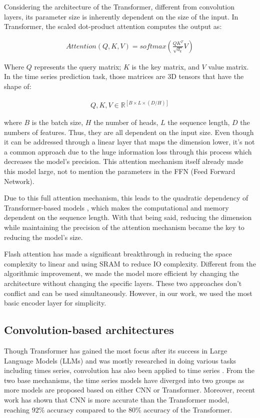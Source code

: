 \documentclass[stu,12pt,floatsintext]{apa7}
\begin{document}
Considering the architecture of the Transformer, different from convolution layers, its parameter size is inherently dependent on the size of the input. In Transformer, the scaled dot-product attention \cite{attention-is-all-you-need} computes the output as:

\begin{gather}
    Attention(Q,K,V)=softmax(\frac{QK^T}{\sqrt{d_k}}V)
\end{gather}

Where $Q$ represents the query matrix; $K$ is the key matrix, and $V$ value matrix. In the time series prediction task, those matrices are 3D tensors that have the shape of:

\begin{gather}
        Q,K,V\in \mathbb{R}^{[B\times L\times (D/H)]}
\end{gather}

where $B$ is the batch size, $H$ the number of heads, $L$ the sequence length, $D$ the numbers of features. Thus, they are all dependent on the input size. Even though it can be addressed through a linear layer that maps the dimension lower, it's not a common approach due to the huge information loss through this process which decreases the model's precision. This attention mechanism itself already made this model large, not to mention the parameters in the FFN (Feed Forward Network). 

Due to this full attention mechanism, this leads to the quadratic dependency of Transformer-based models \cite{bigbird}, which makes the computational and memory dependent on the sequence length. With that being said, reducing the dimension while maintaining the precision of the attention mechanism became the key to reducing the model's size. 

Flash attention has made a significant breakthrough in reducing the space complexity to linear and using SRAM to reduce IO complexity. Different from the algorithmic improvement, we made the model more efficient by changing the architecture without changing the specific layers. These two approaches don't conflict and can be used simultaneously. However, in our work, we used the most basic encoder layer for simplicity. 

\subsection{Convolution-based architectures}

Though Transformer has gained the most focus after its success in Large Language Models (LLMs) and was mostly researched in doing various tasks including times series, convolution has also been applied to time series \cite{hewage2020temporal}. From the two base mechanisms, the time series models have diverged into two groups as more models are proposed based on either CNN or Transformer. Moreover, recent work \cite{cnntransformercompare} has shown that CNN is more accurate than the Transformer model, reaching $92\%$ accuracy compared to the $80\%$ accuracy of the Transformer. 
\end{document}
